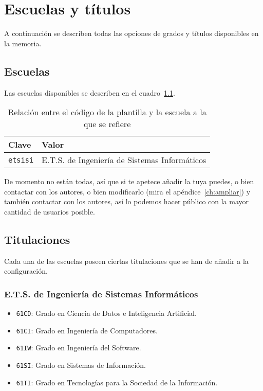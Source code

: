 \chapter{Escuelas y títulos}
\label{ch:escuelas-y-titulos}

A continuación se describen todas las opciones de grados y títulos disponibles en la memoria.

\section{Escuelas}

Las escuelas disponibles se describen en el cuadro~\ref{tbl:schools}.

\begin{table}[h]
    \centering
    \begin{tabular}{@{}ll@{}}
        \toprule
        \textbf{Clave}  & \textbf{Valor} \\
        \midrule
        \texttt{etsisi} & E.T.S. de Ingeniería de Sistemas Informáticos \\
        \bottomrule
    \end{tabular}
    \caption{\label{tbl:schools} Relación entre el código de la plantilla y la escuela a la que se refiere}
\end{table}

De momento no están todas, así que si te apetece añadir la tuya puedes, o bien contactar con los autores, o bien modificarlo (mira el apéndice~\ref{ch:ampliar}) y también contactar con los autores, así lo podemos hacer público con la mayor cantidad de usuarios posible.

\section{Titulaciones}

Cada una de las escuelas poseen ciertas titulaciones que se han de añadir a la configuración.

\subsection{E.T.S. de Ingeniería de Sistemas Informáticos}

\begin{itemize}
    \item \texttt{61CD}: Grado en Ciencia de Datos e Inteligencia Artificial.
    \item \texttt{61CI}: Grado en Ingeniería de Computadores.
    \item \texttt{61IW}: Grado en Ingeniería del Software.
    \item \texttt{61SI}: Grado en Sistemas de Información.
    \item \texttt{61TI}: Grado en Tecnologías para la Sociedad de la Información.
\end{itemize}
